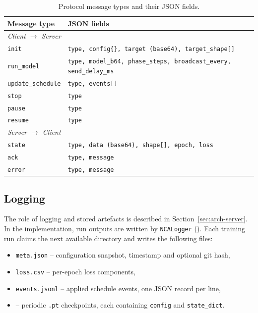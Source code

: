 \begin{table}[htbp]
    \centering
    \small
    \begin{tabular}{p{}p{}}
        \hline
        \textbf{Message type} & \textbf{JSON fields}\\
        \hline
        \multicolumn{2}{l}{\textit{Client $\rightarrow$ Server}}\\
        \texttt{init} & \texttt{type, config\{\}, target (base64),
                         target\_shape[]}\\
        \texttt{run\_model} & \texttt{type, model\_b64, phase\_steps,
                               broadcast\_every, send\_delay\_ms}\\
        \texttt{update\_schedule} & \texttt{type, events[]}\\
        \texttt{stop}   & \texttt{type}\\
        \texttt{pause}  & \texttt{type}\\
        \texttt{resume} & \texttt{type}\\
        \hline
        \multicolumn{2}{l}{\textit{Server $\rightarrow$ Client}}\\
        \texttt{state} & \texttt{type, data (base64), shape[], epoch,
                          loss}\\
        \texttt{ack}   & \texttt{type, message}\\
        \texttt{error} & \texttt{type, message}\\
        \hline
    \end{tabular}
    \caption{Protocol message types and their JSON fields.}
    \label{tab:message-types}
\end{table}

\subsection{Logging}

The role of logging and stored artefacts is described in
Section~\ref{sec:arch-server}. In the implementation, run outputs are written
by \texttt{NCALogger} (). Each training run
claims the next available  directory and writes the
following files:

\begin{itemize}
    \item \texttt{meta.json} -- configuration snapshot, timestamp and
          optional git hash,
    \item \texttt{loss.csv} -- per-epoch loss components,
    \item \texttt{events.jsonl} -- applied schedule events, one JSON record
          per line,
        \item {} -- periodic \texttt{.pt} checkpoints, each
          containing \texttt{config} and \texttt{state\_dict}.
\end{itemize}

